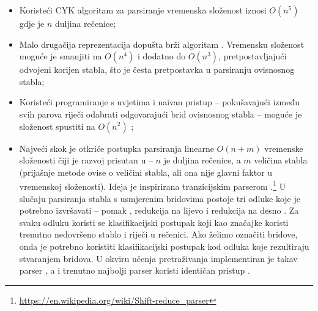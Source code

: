 \begin{itemize}
  \item Koristeći CYK algoritam za parsiranje vremenska složenost iznosi
  $O(n^5)$ gdje je $n$ duljina rečenice;

  \item Malo drugačija reprezentacija dopušta brži algoritam
  \citep{eisner1999efficient}. Vremensku složenost moguće je smanjiti na
  $O(n^4)$ i dodatno do $O(n^3)$, pretpostavljajući odvojeni korijen 
  stabla, što je česta pretpostavka u parsiranju ovisnosnog stabla;

  \item Koristeći programiranje s uvjetima  i
  naivan pristup -- pokušavajući između svih parova riječi odabrati odgovarajući
  brid ovisnosnog stabla -- moguće je složenost spustiti na $O(n^2)$
  \citep{covington2001fundamental};

  \item Najveći skok je otkriće postupka parsiranja linearne $O(n + m)$
  vremenske složenosti čiji je razvoj prisutan u \citep{nivre03efficient,
  zhang2011transition, bohnet2012transition} -- $n$ je duljina rečenice, a $m$
  veličina stabla (prijašnje metode ovise o veličini stabla, ali ona nije glavni
  faktor u vremenskoj složenosti). Ideja je inspirirana tranzicijskim parserom
  .\footnote{\url{https://en.wikipedia.org/wiki/Shift-reduce_parser}} U
  slučaju parsiranja stabla s usmjerenim bridovima  postoje
  tri odluke koje je potrebno izvršavati -- pomak , redukcija na
  lijevo  i redukcija na desno . Za svaku
  odluku koristi se klasifikacijski postupak koji kao značajke koristi trenutno
  nedovršeno stablo i riječi u rečenici. Ako želimo označiti bridove, onda je
  potrebno koristiti klasifikacijski postupak kod odluka koje rezultiraju
  stvaranjem bridova. U okviru učenja pretraživanja implementiran je takav
  parser \citep{chang2015learning}, a i trenutno najbolji parser koristi
  identičan pristup \citep{andor2016globally}.

\end{itemize}

